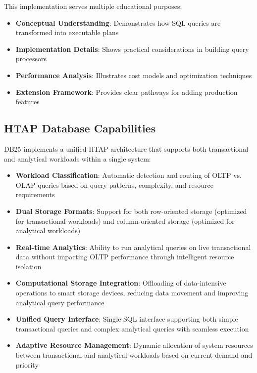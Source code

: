 \documentclass[12pt,a4paper]{article}
\begin{document}
    This implementation serves multiple educational purposes:

    \begin{itemize}
        \item \textbf{Conceptual Understanding}: Demonstrates how SQL queries are transformed into executable plans
        \item \textbf{Implementation Details}: Shows practical considerations in building query processors
        \item \textbf{Performance Analysis}: Illustrates cost models and optimization techniques
        \item \textbf{Extension Framework}: Provides clear pathways for adding production features
    \end{itemize}

    \subsection{HTAP Database Capabilities}

    DB25 implements a unified HTAP architecture that supports both transactional and analytical workloads within a single system:

    \begin{itemize}
        \item \textbf{Workload Classification}: Automatic detection and routing of OLTP vs. OLAP queries based on query patterns, complexity, and resource requirements
        \item \textbf{Dual Storage Formats}: Support for both row-oriented storage (optimized for transactional workloads) and column-oriented storage (optimized for analytical workloads)
        \item \textbf{Real-time Analytics}: Ability to run analytical queries on live transactional data without impacting OLTP performance through intelligent resource isolation
        \item \textbf{Computational Storage Integration}: Offloading of data-intensive operations to smart storage devices, reducing data movement and improving analytical query performance
        \item \textbf{Unified Query Interface}: Single SQL interface supporting both simple transactional queries and complex analytical queries with seamless execution
        \item \textbf{Adaptive Resource Management}: Dynamic allocation of system resources between transactional and analytical workloads based on current demand and priority
    \end{itemize}
\end{document}
